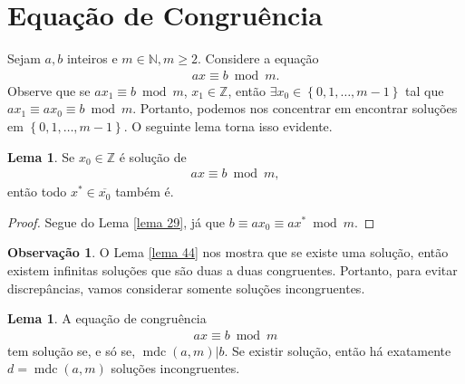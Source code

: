 \documentclass[a4paper,11pt,twoside, leqno]{article}
\DeclareMathOperator{\mdc}{mdc}
\theoremstyle{definition}
\newtheorem{lemma}[theorem]{Lema}
\newtheorem{remark}{Observação}[section]
\begin{document}
\section{Equação de Congruência}
\hspace{12pt} Sejam $a,b$ inteiros e $m\in\mathbb{N}, m\geq 2$. Considere a equação
\begin{align*}
ax\equiv b\bmod m.
\end{align*} 
Observe que se $ax_1\equiv b\bmod m$, $x_1\in\mathbb{Z}$, então $\exists x_0\in\left\{ 0,1,\dots,m-1 \right\}$ tal que $ax_1\equiv ax_0\equiv b\bmod m$. Portanto, podemos nos concentrar em encontrar soluções em $\left\{ 0,1,\dots,m-1 \right\}$. O seguinte lema torna isso evidente.
\begin{lemma}
	\label{lema 44}
	Se $x_0\in\mathbb{Z}$ é solução de 
	\begin{align*}
	ax\equiv b\bmod m,
	\end{align*}
	então todo $x^{\ast}\in\overline{x_0}$ também é.
\end{lemma}
\begin{proof}
	Segue do Lema \eqref{lema 29}, já que $b\equiv ax_0\equiv ax^\ast\bmod m$.
\end{proof}
\begin{remark}
	O Lema \eqref{lema 44} nos mostra que se existe uma solução, então existem infinitas soluções que são duas a duas congruentes. Portanto, para evitar discrepâncias, vamos considerar somente soluções incongruentes.
\end{remark}
\begin{lemma}
	\label{lema 45}
	A equação de congruência
	\begin{align*}
	ax\equiv b\bmod m
	\end{align*}
	tem solução se, e só se, $\mdc(a,m)|b$. Se existir solução, então há exatamente $d=\mdc(a,m)$ soluções incongruentes.
\end{lemma}
\end{document}
